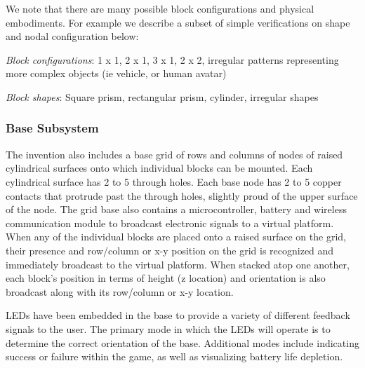 \documentclass[]{article}
\begin{document}
We note that there are many possible block configurations and physical embodiments. For example we describe a subset of simple verifications on shape and nodal configuration below:

\emph{Block configurations}:
1 x 1, 2 x 1, 3 x 1, 2 x 2, irregular patterns representing more complex objects (ie vehicle, or human avatar)

\emph{Block shapes}:
Square prism, rectangular prism, cylinder, irregular shapes


\subsubsection{Base Subsystem}
The invention also includes a base grid of rows and columns of nodes of raised cylindrical surfaces onto which individual blocks can be mounted. Each cylindrical surface has 2 to 5 through holes. Each base node has 2 to 5 copper contacts that protrude past the through holes, slightly proud of  the upper surface of the node. The grid base also contains a microcontroller, battery and wireless communication module to broadcast electronic signals to a virtual platform. When any of the individual blocks are placed onto a raised surface on the grid, their presence and row/column or x-y position on the grid is recognized and immediately broadcast to the virtual platform. When stacked atop one another, each block’s position in terms of height (z location) and orientation is also broadcast along with its row/column or x-y location.

LEDs have been embedded in the base to provide a variety of different feedback signals to the user.  The primary mode in which the LEDs will operate is to determine the correct orientation of the base.  Additional modes include indicating success or failure within the game, as well as visualizing battery life depletion.
\end{document}

